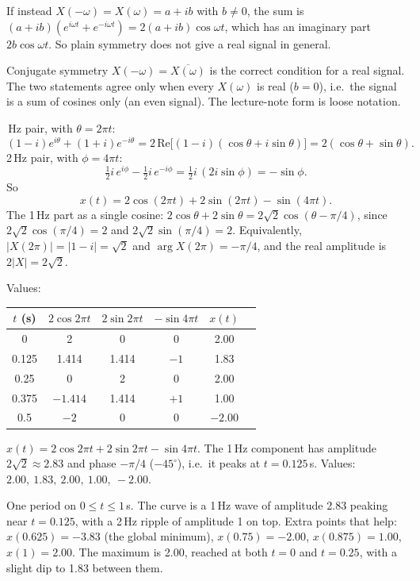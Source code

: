\documentclass[10pt,letterpaper]{article}
\newcommand{\ans}[1]{\par\vspace{3pt}{\bfseries #1}\quad}
\begin{document}
If instead $X(-\omega) = X(\omega) = a + ib$ with $b \ne 0$, the sum is $(a+ib)(e^{i\omega t} + e^{-i\omega t}) = 2(a+ib)\cos\omega t$, which has an imaginary part $2b\cos\omega t$. So plain symmetry does not give a real signal in general.
\begin{result}
Conjugate symmetry $X(-\omega) = \overline{X(\omega)}$ is the correct condition for a real signal. The two statements agree only when every $X(\omega)$ is real ($b = 0$), i.e.\ the signal is a sum of cosines only (an even signal). The lecture-note form is loose notation.
\end{result}

\ans{1c.}
1\,Hz pair, with $\theta = 2\pi t$:
\[
(1 - i)e^{i\theta} + (1 + i)e^{-i\theta} = 2\,\mathrm{Re}\big[(1-i)(\cos\theta + i\sin\theta)\big] = 2(\cos\theta + \sin\theta).
\]
2\,Hz pair, with $\phi = 4\pi t$:
\[
\tfrac12 i\, e^{i\phi} - \tfrac12 i\, e^{-i\phi} = \tfrac12 i\,(2i\sin\phi) = -\sin\phi.
\]
So
\[
x(t) = 2\cos(2\pi t) + 2\sin(2\pi t) - \sin(4\pi t).
\]
The 1\,Hz part as a single cosine: $2\cos\theta + 2\sin\theta = 2\sqrt{2}\cos(\theta - \pi/4)$, since $2\sqrt2\cos(\pi/4) = 2$ and $2\sqrt2\sin(\pi/4) = 2$. Equivalently, $|X(2\pi)| = |1-i| = \sqrt2$ and $\arg X(2\pi) = -\pi/4$, and the real amplitude is $2|X| = 2\sqrt2$.

Values:

\begin{center}
\begin{tabular}{cccccc}
\toprule
$t$ (s) & $2\cos 2\pi t$ & $2\sin 2\pi t$ & $-\sin 4\pi t$ & $x(t)$ \\
\midrule
0 & 2 & 0 & 0 & 2.00 \\
0.125 & 1.414 & 1.414 & $-1$ & 1.83 \\
0.25 & 0 & 2 & 0 & 2.00 \\
0.375 & $-1.414$ & 1.414 & $+1$ & 1.00 \\
0.5 & $-2$ & 0 & 0 & $-2.00$ \\
\bottomrule
\end{tabular}
\end{center}
\begin{result}
$x(t) = 2\cos 2\pi t + 2\sin 2\pi t - \sin 4\pi t$. The 1\,Hz component has amplitude $2\sqrt2 \approx 2.83$ and phase $-\pi/4$ ($-45^\circ$), i.e.\ it peaks at $t = 0.125$\,s. Values: $2.00,\ 1.83,\ 2.00,\ 1.00,\ -2.00$.
\end{result}
\begin{sketch}
One period on $0 \le t \le 1$\,s. The curve is a 1\,Hz wave of amplitude 2.83 peaking near $t = 0.125$, with a 2\,Hz ripple of amplitude 1 on top. Extra points that help: $x(0.625) = -3.83$ (the global minimum), $x(0.75) = -2.00$, $x(0.875) = 1.00$, $x(1) = 2.00$. The maximum is 2.00, reached at both $t = 0$ and $t = 0.25$, with a slight dip to 1.83 between them.
\end{sketch}
\end{document}
